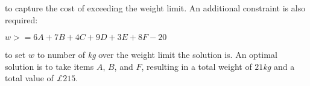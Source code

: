 \documentclass[11pt]{article} %
\begin{document}
to capture the cost of exceeding the weight limit. An additional constraint is also required:

\begin{center}

$w >= 6A + 7B + 4C + 9D + 3E + 8F - 20$

\end{center}

to set $w$ to number of \textit{kg} over the weight limit the solution is.
An optimal solution is to take items $A$, $B$, and $F$, resulting in a total weight of $21$\textit{kg} and a total value of \textit{£}$215$.
\end{document}
